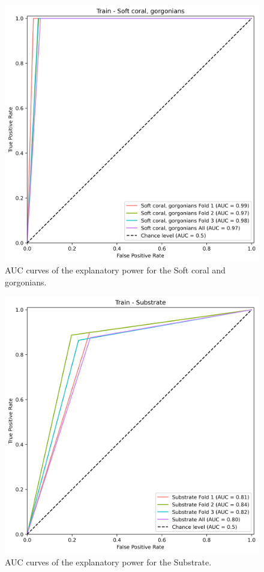 \begin{figure}
\hypertarget{fig:chap3figS19}{%
\centering
\includegraphics{03-Chapitre3/figures/supplementary/03-receiver_operator_curve_train_rf_Soft coral, gorgonians.png}
\caption{AUC curves of the explanatory power for the Soft coral and
gorgonians.}\label{fig:chap3figS19}
}
\end{figure}

\begin{figure}
\hypertarget{fig:chap3figS20}{%
\centering
\includegraphics{03-Chapitre3/figures/supplementary/03-receiver_operator_curve_train_rf_Substrate.png}
\caption{AUC curves of the explanatory power for the
Substrate.}\label{fig:chap3figS20}
}
\end{figure}

